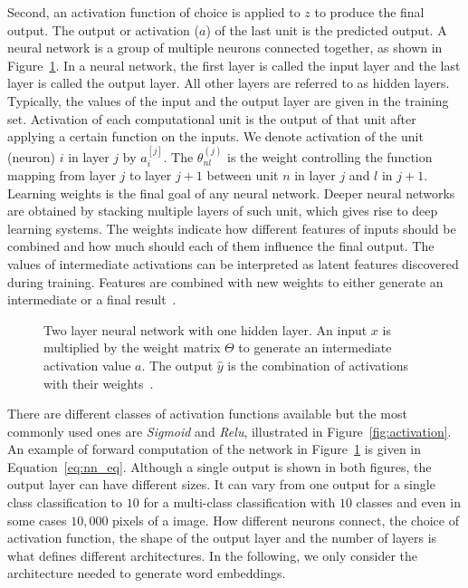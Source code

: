 Second, an activation function of choice is applied to $z$ to produce the final output. The output or activation ($a$) of the last unit is the predicted output. A neural network is a group of multiple neurons connected together, as shown in Figure~\ref{fig:nn}. In a
neural network, the first layer is called the input layer and the last layer is called the output layer. All other layers are referred to as hidden layers.
Typically, the values of the input and the output layer are given in the training set. Activation of each computational unit is the output of that unit after applying a certain function on the inputs. We denote activation of the unit (neuron) $i$ in layer $j$ by $a_{i}^{[j]}$.
The $\theta^{(j)}_{nl}$ is the weight controlling the function mapping from layer $j$ to layer $j+1$ between unit $n$ in layer $j$ and $l$ in $j+1$. Learning weights is the final goal of any neural network. Deeper neural networks are obtained by stacking multiple layers of such unit, which gives rise to deep learning systems. 
%
The weights indicate how different features of inputs should be combined and how much should each of them influence the final output. The values of intermediate activations can be interpreted as latent features discovered during training. Features are combined with new weights to either generate an intermediate or a final
result~. \\
\begin{figure}
\centering 
\resizebox{0.65\textwidth}{0.4\textwidth}{      

}
\caption{Two layer neural network with one hidden layer. An input $x$ is multiplied by the weight matrix $\Theta$ to generate an intermediate activation value $a$. The output $\hat { y } $ is the combination of activations with their weights~.}
\label{fig:nn}
\end{figure}
\noindent
There are different classes of activation functions available but the most commonly used ones are \emph{Sigmoid} and \emph{Relu}, illustrated in Figure~\ref{fig:activation}. An example of forward computation of the network in Figure~\ref{fig:nn} is given in Equation~\ref{eq:nn_eq}. Although a single output is shown in both figures, the output layer can have different sizes. It can vary from one output for a single class classification to $10$ for a multi-class classification with $10$ classes and even in some cases $10,000$ pixels of a image. How different neurons connect, the choice of activation function, the shape of the output layer and the number of layers is what defines different architectures. In the following, we only consider the architecture needed to generate word embeddings. 
